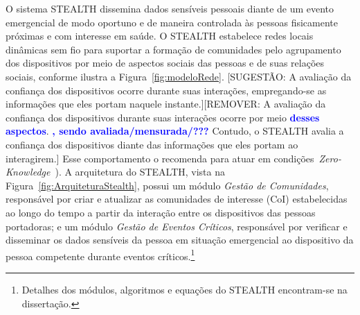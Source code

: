 \documentclass[12pt]{article}
\newcommand{\as}[1]{\textcolor{blue}{{\bf #1}}}
\newcommand{\agn}[1]{\textcolor{auburn}{#1}}
\begin{document}
O sistema \mbox{STEALTH} dissemina dados sensíveis pessoais diante de um evento emergencial de modo oportuno e de maneira controlada às pessoas fisicamente próximas e com interesse em saúde. O \mbox{STEALTH} estabelece redes locais dinâmicas sem fio para suportar
a formação de comunidades pelo agrupamento dos dispositivos por meio de aspectos sociais das pessoas e de suas relações sociais, conforme ilustra a Figura~\ref{fig:modeloRede}.
\agn{[SUGESTÃO: A avaliação da confiança dos dispositivos ocorre durante suas interações, empregando-se as informações que eles portam naquele instante.][REMOVER: }
A avaliação da confiança dos dispositivos durante suas interações ocorre por meio \as{desses aspectos}.
\as{, sendo avaliada/mensurada/???} 
Contudo, o \mbox{STEALTH} avalia a confiança dos dispositivos
\agn{diante das}
informações que eles portam ao interagirem.\agn{]} Esse comportamento o recomenda para atuar em condições~\textit{Zero-Knowledge}~\cite{kim2015hcs}).
A arquitetura do \mbox{STEALTH}, vista 
na Figura~\ref{fig:ArquiteturaStealth}, possui um módulo {\it Gestão de Comunidades}, responsável por criar e atualizar as comunidades de interesse (CoI) estabelecidas ao longo do tempo a partir da interação entre os dispositivos das pessoas portadoras; e um módulo {\it Gestão de Eventos Críticos}, responsável por verificar e disseminar os dados sensíveis da pessoa em situação emergencial ao dispositivo da pessoa competente durante eventos críticos.\footnote{Detalhes dos módulos, algoritmos e equações do  \mbox{STEALTH} encontram-se na dissertação.}
\end{document}
